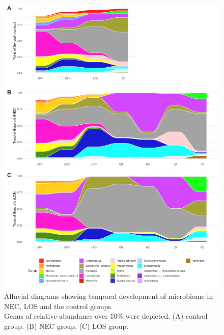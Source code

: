 \documentclass[fleqn,10pt]{wlpeerj} %
\begin{document}
\begin{figure}[ht]\centering
  \includegraphics[width=\linewidth]{taxon.pdf}
  \caption{Alluvial diagrams showing temporal development of microbiome in NEC, LOS and the control groups. \\ Genus of relative abundance over 10\% were depicted. (A) control group. (B) NEC group. (C) LOS group.}
  \label{fig:taxa-time}
\end{figure}




\end{document}

